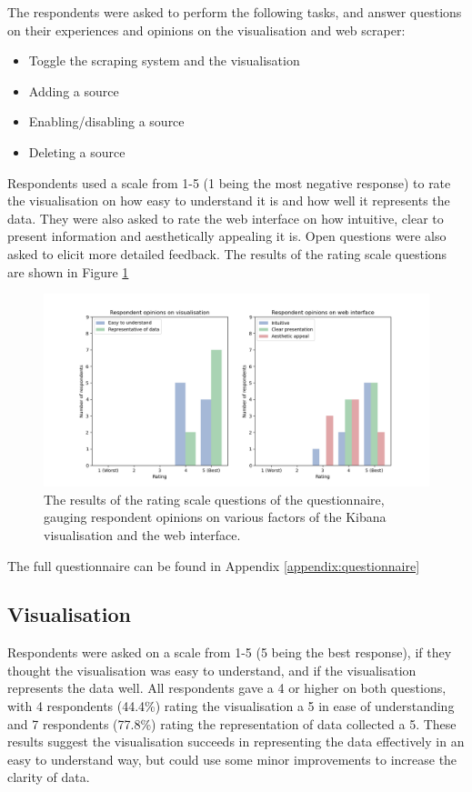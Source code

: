 \documentclass{l4proj}
\begin{document}
The respondents were asked to perform the following tasks, and answer questions on their experiences and opinions on the visualisation and web scraper:
\begin{itemize}
    \item Toggle the scraping system and the visualisation
    \item Adding a source
    \item Enabling/disabling a source
    \item Deleting a source
\end{itemize}

Respondents used a scale from 1-5 (1 being the most negative response) to rate the visualisation on how easy to understand it is and how well it represents the data. They were also asked to rate the web interface on how intuitive, clear to present information and aesthetically appealing it is. Open questions were also asked to elicit more detailed feedback. The results of the rating scale questions are shown in Figure \ref{fig:questionnaire-ratings}

 \begin{figure}[h]
\centering
\includegraphics[width=\textwidth]{images/questionnaire_responses.png}
\caption{The results of the rating scale questions of the questionnaire, gauging respondent opinions on various factors of the Kibana visualisation and the web interface.}
\label{fig:questionnaire-ratings}
\end{figure}


The full questionnaire can be found in Appendix \ref{appendix:questionnaire}

\subsection{Visualisation}
Respondents were asked on a scale from 1-5 (5 being the best response), if they thought the visualisation was easy to understand, and if the visualisation represents the data well. All respondents gave a 4 or higher on both questions, with 4 respondents (44.4\%) rating the visualisation a 5 in ease of understanding and 7 respondents (77.8\%) rating the representation of data collected a 5. These results suggest the visualisation succeeds in representing the data effectively in an easy to understand way, but could use some minor improvements to increase the clarity of data.
\end{document}
